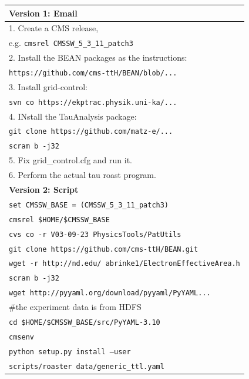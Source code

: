 \documentclass{acm_proc_article-sp}
\begin{document}
\begin{table}
    \centering
    \begin{tabular}{|l|}
        \hline
        {\bf Version 1: Email}\\ \hline
        1. Create a CMS release,\\
            \hspace{9pt} e.g. {\tt cmsrel CMSSW\_5\_3\_11\_patch3} \\
        2. Install the BEAN packages as the instructions: \\
            \hspace{9pt} {\tt https://github.com/cms-ttH/BEAN/blob/...}\\
        3. Install grid-control: \\ 
            \hspace{9pt} {\tt svn co https://ekptrac.physik.uni-ka/...} \\
        4. INstall the TauAnalysis package: \\
           \hspace{9pt} {\tt git clone https://github.com/matz-e/...} \\
           \hspace{9pt} {\tt scram b -j32} \\
        5. Fix grid\_control.cfg and run it. \\
        6. Perform the actual tau roast program. \\ 
        \hline
        {\bf Version 2: Script}\\ \hline
        {\tt set CMSSW\_BASE = (CMSSW\_5\_3\_11\_patch3)} \\
        {\tt cmsrel \$HOME/\$CMSSW\_BASE} \\
        {\tt cvs co -r V03-09-23 PhysicsTools/PatUtils} \\
        {\tt git clone {\tt https://github.com/cms-ttH/BEAN.git}} \\
        {\tt wget -r http://nd.edu/~abrinke1/ElectronEffectiveArea.h} \\
        {\tt scram b -j32} \\
        {\tt wget http://pyyaml.org/download/pyyaml/PyYAML...}\\
        \#the experiment data is from HDFS \\
        {\tt cd \$HOME/\$CMSSW\_BASE/src/PyYAML-3.10}\\
        {\tt cmsenv}\\
        {\tt python setup.py install --user} \\
        {\tt scripts/roaster data/generic\_ttl.yaml} \\ 

\end{tabular}
\end{table}
\end{document}

